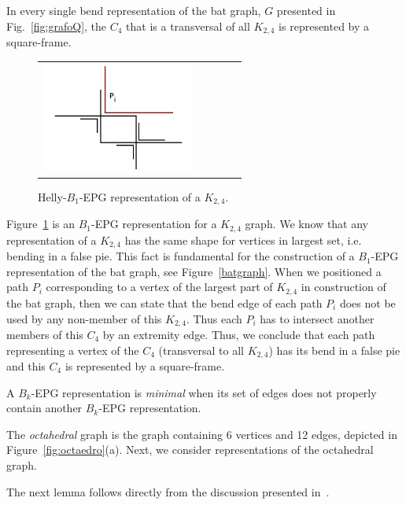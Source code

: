 \begin{corollary}\label{batgraph}
In every single bend representation of the bat graph, $G$ presented in Fig.~\ref{fig:grafoQ}, the $C_4$ that is a transversal of all $K_{2,4}$ is represented by a square-frame.
\end{corollary}


\begin{figure}[htb]
  \centering
  \begin{tabular}{c c c c c }
   \includegraphics[width=5cm]{./img/representationQ2}
  \end{tabular}
  \caption{Helly-$B_1$-EPG representation of a $K_{2,4}$.}\label{fig:grafoQ2}
\end{figure} 

Figure~\ref{fig:grafoQ2} is an $B_1$-EPG representation for a $K_{2,4}$ graph. We know that any representation of a $K_{2,4}$ has the same shape for vertices in largest set, i.e. bending in a false pie. This fact is fundamental for the construction of a $B_1$-EPG representation of the bat graph, see Figure~\ref{batgraph}. When  we positioned a path $P_i$ corresponding to a vertex of the largest part of $K_{2,4}$ in construction of the bat graph, then we can state that the bend edge of each path $P_i$ does not be used by any non-member of this $K_{2,4}$. Thus each $P_i$ has to intersect another members of this $C_4$ by an extremity edge. Thus, we conclude that each path representing a vertex of the $C_4$ (transversal to all $K_{2,4}$) has its bend in a false pie and this $C_4$ is represented by a square-frame.

\begin{definition}
A $B_k$-EPG representation is \emph{minimal} 
when its set of edges does not properly contain another $B_k$-EPG representation. 
\end{definition}

The \textit{octahedral} graph is the graph containing 6 vertices and 12 edges, depicted  in Figure~\ref{fig:octaedro}(a). Next, we consider representations of the octahedral graph.
 

The next lemma follows directly from the discussion presented in~\cite{heldt2014}.

